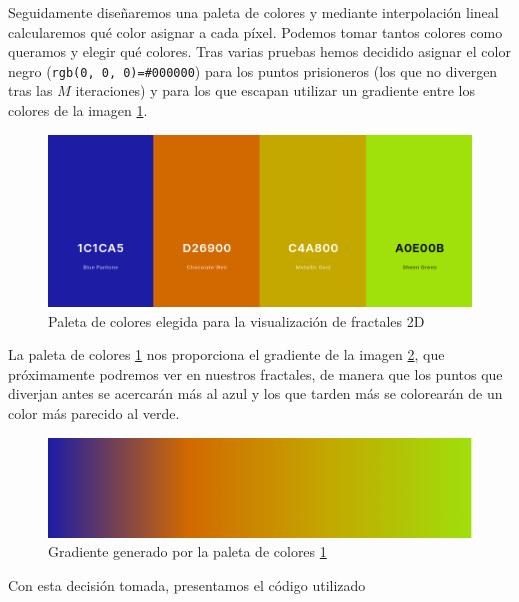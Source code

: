 Seguidamente diseñaremos una paleta de colores y mediante interpolación lineal calcularemos qué color asignar a cada píxel. Podemos tomar tantos colores como queramos y elegir qué colores. Tras varias pruebas hemos decidido asignar el color negro (\verb|rgb(0, 0, 0)=#000000|) para los puntos prisioneros (los que no divergen tras las $M$ iteraciones) y para los que escapan utilizar un gradiente entre los colores de la imagen \ref{fig:paleta}.

\begin{figure} [ht]
    \centering
    \includegraphics[scale = 0.4]{img/C6/paleta.png}
    \caption{Paleta de colores elegida para la visualización de fractales 2D}
    \label{fig:paleta}
\end{figure}

La paleta de colores \ref{fig:paleta} nos proporciona el gradiente de la imagen \ref{fig:gradiente}, que próximamente podremos ver en nuestros fractales, de manera que los puntos que diverjan antes se acercarán más al azul y los que tarden más se colorearán de un color más parecido al verde.

\begin{figure} [ht]
    \centering
    \includegraphics[scale = 0.51]{img/C6/gradiente.png}
    \caption{Gradiente generado por la paleta de colores \ref{fig:paleta}}
    \label{fig:gradiente}
\end{figure}

Con esta decisión tomada, presentamos el código utilizado

